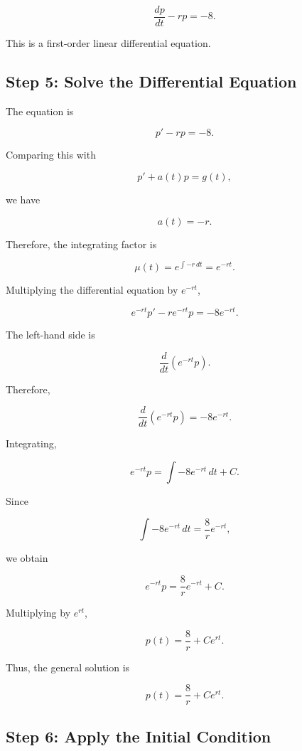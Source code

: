 \documentclass[11pt]{article}
\begin{document}
\[
\boxed{
\frac{dp}{dt}-rp=-8.
}
\]

This is a first-order linear differential equation.

\subsection{Step 5: Solve the Differential Equation}

The equation is

\[
p'-rp=-8.
\]

Comparing this with

\[
p'+a(t)p=g(t),
\]

we have

\[
a(t)=-r.
\]

Therefore, the integrating factor is

\[
\mu(t)
=
e^{\int -r\,dt}
=
e^{-rt}.
\]

Multiplying the differential equation by \(e^{-rt}\),

\[
e^{-rt}p'-re^{-rt}p
=
-8e^{-rt}.
\]

The left-hand side is

\[
\frac{d}{dt}
\left(
e^{-rt}p
\right).
\]

Therefore,

\[
\frac{d}{dt}
\left(
e^{-rt}p
\right)
=
-8e^{-rt}.
\]

Integrating,

\[
e^{-rt}p
=
\int -8e^{-rt}\,dt+C.
\]

Since

\[
\int -8e^{-rt}\,dt
=
\frac{8}{r}e^{-rt},
\]

we obtain

\[
e^{-rt}p
=
\frac{8}{r}e^{-rt}+C.
\]

Multiplying by \(e^{rt}\),

\[
p(t)
=
\frac{8}{r}
+
Ce^{rt}.
\]

Thus, the general solution is

\[
\boxed{
p(t)=\frac{8}{r}+Ce^{rt}.
}
\]

\subsection{Step 6: Apply the Initial Condition}
\end{document}
